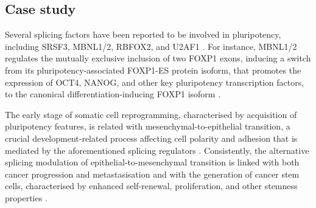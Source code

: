 \subsection{Case study}

Several splicing factors have been reported to be involved in pluripotency, including SRSF3, MBNL1/2, RBFOX2, and U2AF1 \cite{zavolan:2018vi,han:2013ww,venables:2013tz,chen:2015wm}. For instance, MBNL1/2 regulates the mutually exclusive inclusion of two FOXP1 exons, inducing a switch from its pluripotency-associated FOXP1-ES protein isoform, that promotes the expression of OCT4, NANOG, and other key pluripotency transcription factors, to the canonical differentiation-inducing FOXP1 isoform \cite{gabut:2011wk}.

The early stage of somatic cell reprogramming, characterised by acquisition of pluripotency features, is related with mesenchymal-to-epithelial transition, a crucial development-related process affecting cell polarity and adhesion that is mediated by the aforementioned splicing regulators \cite{zavolan:2018vi,pradella:2017wp}. Consistently, the alternative splicing modulation of epithelial-to-mesenchymal transition is linked with both cancer progression and metastasisation and with the generation of cancer stem cells, characterised by enhanced self-renewal, proliferation, and other stemness properties \cite{zavolan:2018vi,pradella:2017wp,aponte:2017wv}.



